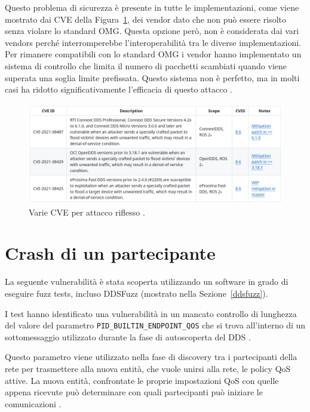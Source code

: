 Questo problema di sicurezza è presente in tutte le implementazioni,
come viene mostrato dai CVE della Figura~\ref{CVErecoinnassance},
dei vendor dato che non può essere risolto senza violare lo 
standard OMG. Questa opzione però, non è considerata dai vari 
vendors perché interromperebbe l'interoperabilità tra le 
diverse implementazioni.
Per rimanere compatibili con lo standard OMG i vendor hanno 
implementato un sistema di controllo che limita il numero 
di pacchetti scambiati quando viene superata una soglia limite
prefissata. Questo sistema non è perfetto, ma in molti casi ha 
ridotto significativamente 
l'efficacia di questo attacco \cite{mayoral2022robot}.

\begin{figure}[H]
    \centering
    \includegraphics[width=15.2cm, keepaspectratio]{img/CVErecoinnassance.png}
    \caption{Varie CVE per attacco riflesso \cite{mayoral2022robot}.}
    \label{CVErecoinnassance}
\end{figure}


\section{Crash di un partecipante}
La seguente vulnerabilità è stata scoperta utilizzando 
un software in grado di eseguire fuzz tests, 
incluso DDSFuzz (mostrato nella Sezione~\ref{ddsfuzz}).

I test hanno identificato una vulnerabilità in un mancato 
controllo di lunghezza del valore del parametro 
\texttt{PID\_BUILTIN\_ENDPOINT\_QOS} che si trova all'interno di 
un sottomessaggio utilizzato durante la fase di autoscoperta
del DDS \cite{mayoral2022robot}. 

Questo parametro viene 
utilizzato nella fase di discovery
tra i partecipanti della rete per trasmettere
alla nuova entità, che vuole unirsi alla rete, le policy
QoS attive. La nuova entità, confrontate 
le proprie impostazioni QoS con quelle appena ricevute
può determinare con quali partecipanti può iniziare le 
comunicazioni \cite{ddsrtps}.

